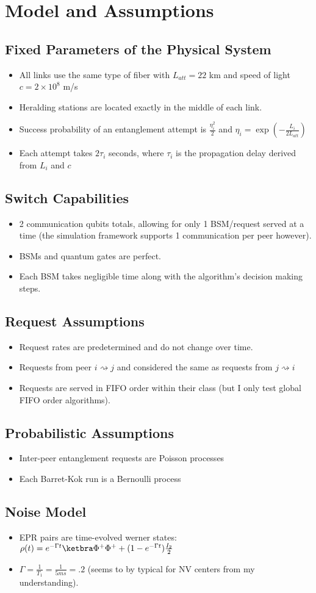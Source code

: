 \section{Model and Assumptions}
\subsection{Fixed Parameters of the Physical System}
\begin{itemize}
    \item All links use the same type of fiber with $L_{att} = 22$ km and speed of light $c = 2 \times 10^8$ m/s
    \item Heralding stations are located exactly in the middle of each link.
    \item Success probability of an entanglement attempt is $\frac{\eta_i^2}{2}$ and $\eta_i = \exp(-\frac{L_i}{2L_{att}})$
    \item Each attempt takes $2\tau_i$ seconds, where $\tau_i$ is the propagation delay derived from $L_i$ and $c$
\end{itemize}
\subsection{Switch Capabilities}
\begin{itemize}
    \item 2 communication qubits totals, allowing for only 1 BSM/request served at a time (the simulation framework supports 1 communication per peer however).
    \item BSMs and quantum gates are perfect.
    \item Each BSM takes negligible time along with the algorithm's decision making steps.
\end{itemize}
\subsection{Request Assumptions}
\begin{itemize}
    \item Request rates are predetermined and do not change over time.
    \item Requests from peer $i \rightsquigarrow j$ and considered the same as requests from $j \rightsquigarrow i$
    \item Requests are served in FIFO order within their class (but I only test global FIFO order algorithms).
\end{itemize}
\subsection{Probabilistic Assumptions}
\begin{itemize}
    \item Inter-peer entanglement requests are Poisson processes
    \item Each Barret-Kok run is a Bernoulli process
\end{itemize}
\subsection{Noise Model}
\begin{itemize}
    \item EPR pairs are time-evolved werner states: $\rho(t) = e^{-\Gamma t}\Phip + (1-e^{-\Gamma t})\frac{I_2}{2}$
    \item $\Gamma = \frac{1}{T_1} = \frac{1}{5 ms} = .2$ (seems to by typical for NV centers from my understanding).
\end{itemize}